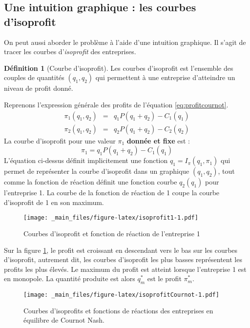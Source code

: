 \documentclass[
  a4paper,
]{book}
\theoremstyle{definition}
\newtheorem{definition}{Définition}[chapter]
\theoremstyle{definition}
\theoremstyle{definition}
\theoremstyle{definition}
\theoremstyle{remark}
\begin{document}
\hypertarget{une-intuition-graphique-les-courbes-disoprofit}{%
\subsection{Une intuition graphique : les courbes d'isoprofit}\label{une-intuition-graphique-les-courbes-disoprofit}}

On peut aussi aborder le problème à l'aide d'une intuition graphique.
Il s'agit de tracer les courbes d'\emph{isoprofit} des entreprises.

\begin{definition}[Courbe d'isoprofit]
Les courbes d'isoprofit est l'ensemble des couples de quantités \((q_1, q_2)\) qui permettent à une entreprise d'atteindre un niveau de profit donné.
\end{definition}

Reprenons l'expression générale des profits de l'équation \eqref{eq:profitcournot}.
\[
\begin{array}{rcl}
\pi_1(q_1, q_2) &=& q_1P(q_1+q_2)-C_1(q_1)\\
\pi_2(q_1, q_2) &=& q_2P(q_1+q_2) -C_2(q_2)
\end{array}
\]
La courbe d'isoprofit pour une valeur \(\pi_1\) \textbf{donnée et fixe} est :
\[
\pi_1 = q_1P(q_1+q_2)-C_1(q_1)
\]
L'équation ci-dessus définit implicitement une fonction \(q_1=I_\pi(q_1, \pi_1)\) qui permet de représenter la courbe d'isoprofit dans un graphique \((q_1,q_2)\), tout comme la fonction de réaction définit une fonction courbe \(q_2(q_1)\) pour l'entreprise 1.
La courbe de la fonction de réaction de 1 coupe la courbe d'isoprofit de 1 en son maximum.

\begin{figure}
\centering
\texttt{[image: \_main\_files/figure-latex/isoprofit1-1.pdf]}
\caption{\label{fig:isoprofit1}Courbes d'isoprofit et fonction de réaction de l'entreprise 1}
\end{figure}

Sur la figure \ref{fig:isoprofit1}, le profit est croissant en descendant vers le bas sur les courbes d'isoprofit, autrement dit, les courbes d'isoprofit les plus basses représentent les profits les plus élevés.
Le maximum du profit est atteint lorsque l'entreprise 1 est en monopole.
La quantité produite est alors \(q_m^*\) est le profit \(\pi_m^*\).

\begin{figure}
\centering
\texttt{[image: \_main\_files/figure-latex/isoprofitCournot-1.pdf]}
\caption{\label{fig:isoprofitCournot}Courbes d'isoprofits et fonctions de réactions des entreprises en équilibre de Cournot Nash.}
\end{figure}
\end{document}
